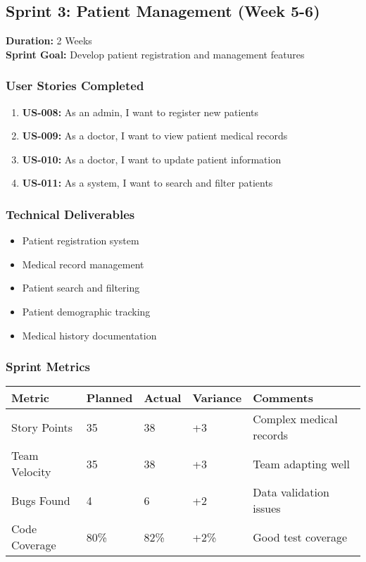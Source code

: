 \documentclass[12pt,a4paper]{article}
\begin{document}
\subsection{Sprint 3: Patient Management (Week 5-6)}
\textbf{Duration:} 2 Weeks \\
\textbf{Sprint Goal:} Develop patient registration and management features

\subsubsection{User Stories Completed}
\begin{enumerate}
    \item \textbf{US-008:} As an admin, I want to register new patients
    \item \textbf{US-009:} As a doctor, I want to view patient medical records
    \item \textbf{US-010:} As a doctor, I want to update patient information
    \item \textbf{US-011:} As a system, I want to search and filter patients
\end{enumerate}

\subsubsection{Technical Deliverables}
\begin{itemize}
    \item Patient registration system
    \item Medical record management
    \item Patient search and filtering
    \item Patient demographic tracking
    \item Medical history documentation
\end{itemize}

\subsubsection{Sprint Metrics}
\begin{longtable}{|p{4cm}|p{2cm}|p{2cm}|p{2cm}|p{4cm}|}
\hline
\textbf{Metric} & \textbf{Planned} & \textbf{Actual} & \textbf{Variance} & \textbf{Comments} \\
\hline
Story Points & 35 & 38 & +3 & Complex medical records \\
\hline
Team Velocity & 35 & 38 & +3 & Team adapting well \\
\hline
Bugs Found & 4 & 6 & +2 & Data validation issues \\
\hline
Code Coverage & 80\% & 82\% & +2\% & Good test coverage \\
\hline
\end{longtable}
\end{document}
